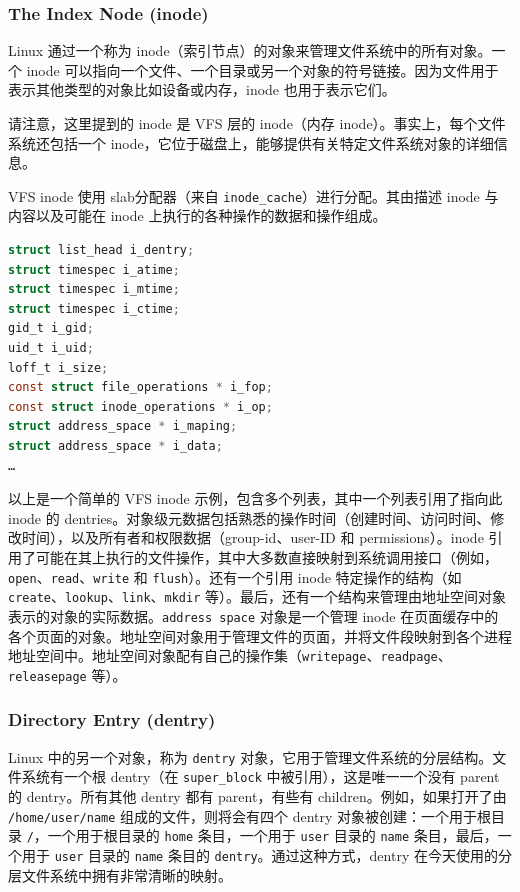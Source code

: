 \documentclass[UTF8,a4paper]{ctexart}
\begin{document}
\subsubsection{The Index Node (inode)}
Linux 通过一个称为
inode（索引节点）的对象来管理文件系统中的所有对象。一个 inode
可以指向一个文件、一个目录或另一个对象的符号链接。因为文件用于表示其他类型的对象比如设备或内存，inode
也用于表示它们。

请注意，这里提到的 inode 是 VFS 层的 inode（内存
inode）。事实上，每个文件系统还包括一个
inode，它位于磁盘上，能够提供有关特定文件系统对象的详细信息。

VFS inode 使用
slab分配器（来自 \texttt{inode\_cache}）进行分配。其由描述 inode
与内容以及可能在 inode 上执行的各种操作的数据和操作组成。

\begin{lstlisting}[language=C]
struct list_head i_dentry;
struct timespec i_atime;
struct timespec i_mtime;
struct timespec i_ctime;
gid_t i_gid;
uid_t i_uid;
loff_t i_size;
const struct file_operations * i_fop;
const struct inode_operations * i_op;
struct address_space * i_maping;
struct address_space * i_data;
…
\end{lstlisting}

以上是一个简单的 VFS inode 示例，包含多个列表，其中一个列表引用了指向此
inode 的
dentries。对象级元数据包括熟悉的操作时间（创建时间、访问时间、修改时间），以及所有者和权限数据（group-id、user-ID
和 permissions）。inode
引用了可能在其上执行的文件操作，其中大多数直接映射到系统调用接口（例如，\texttt{open}、\texttt{read}、\texttt{write}
和 \texttt{flush}）。还有一个引用 inode 特定操作的结构（如
\texttt{create}、\texttt{lookup}、\texttt{link}、\texttt{mkdir}
等）。最后，还有一个结构来管理由地址空间对象表示的对象的实际数据。\texttt{address\ space}
对象是一个管理 inode
在页面缓存中的各个页面的对象。地址空间对象用于管理文件的页面，并将文件段映射到各个进程地址空间中。地址空间对象配有自己的操作集（\texttt{writepage}、\texttt{readpage}、\texttt{releasepage}
等）。

\subsubsection{Directory Entry (dentry)}

Linux 中的另一个对象，称为 \texttt{dentry}
对象，它用于管理文件系统的分层结构。文件系统有一个根 dentry（在
\texttt{super\_block} 中被引用），这是唯一一个没有 parent 的
dentry。所有其他 dentry 都有 parent，有些有 children。例如，如果打开了由
\texttt{/home/user/name} 组成的文件，则将会有四个 dentry
对象被创建：一个用于根目录 \texttt{/}，一个用于根目录的 \texttt{home}
条目，一个用于 \texttt{user} 目录的 \texttt{name} 条目，最后，一个用于
\texttt{user} 目录的 \texttt{name} 条目的
\texttt{dentry}。通过这种方式，dentry
在今天使用的分层文件系统中拥有非常清晰的映射。
\end{document}

